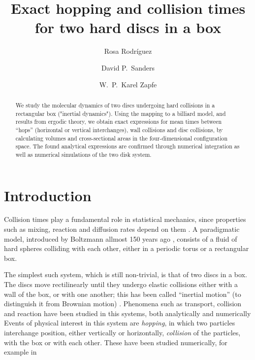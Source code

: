 \documentclass[superscriptaddress,pre,reprint,showpacs,onecolumn]{revtex4-1}
\begin{document}
\title{Exact hopping and collision times for two hard discs in a box}

\author{Rosa Rodríguez}

\author{David P.~Sanders}

\author{W.~P.~Karel Zapfe}



\begin{abstract}
We study the molecular dynamics of two discs undergoing hard collisions in a rectangular box ("inertial dynamics").
Using the mapping to a billiard model, and results from ergodic theory, we obtain exact expressions for mean times between ``hops'' (horizontal or vertical interchanges), wall collisions and disc collisions, by calculating
volumes and cross-sectional areas in the four-dimensional configuration space.
The found analytical expressions are confirmed through numerical integration as well as numerical simulations of the two disk system. 
\end{abstract}

\maketitle



\section{Introduction}


Collision times play a fundamental role in statistical mechanics, since properties
such as mixing, reaction and diffusion rates depend on them \cite{Boltz72, Tolman, VanKampen}.
A paradigmatic model, introduced by Boltzmann allmost 150 years ago \cite{Boltz72, SzaszBook00},
consists of a fluid of hard spheres colliding with each other, either in a periodic torus or 
a rectangular box.

The simplest such system, which is still non-trivial, is that of two discs in a box.
The discs move rectilinearly until they undergo
elastic collisions either with a wall of the box, or with one another; this has been called ``inertial motion'' (to distinguish it from Brownian motion) \cite{Bowles04}.
Phenomena such as transport, collision and reaction
have been studied in this systems, both analytically 
 \cite{Awazu01, Munakata02, Suh05} and numerically \cite{MacElroy2005}
 Events of physical interest in this system are \emph{hopping},
in which two particles interchange position, either vertically or horizontally,
\emph{collision} of the particles, with the box or with each other.
These have been studied numerically, for example in \cite{MacElroy2004}
 
\end{document}
